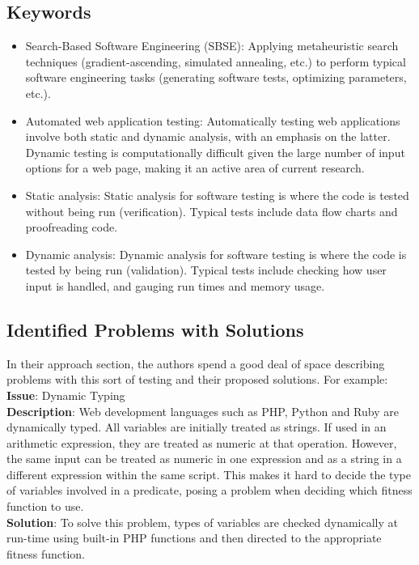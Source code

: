 \documentclass{sig-alternate-05-2015}
\begin{document}
\subsection{Keywords}
\begin{itemize}
\item Search-Based Software Engineering (SBSE): Applying metaheuristic search techniques (gradient-ascending, simulated annealing, etc.) to perform typical software engineering tasks (generating software tests, optimizing parameters, etc.).
\item Automated web application testing: Automatically testing web applications involve both static and dynamic analysis, with an emphasis on the latter. Dynamic testing is computationally difficult given the large number of input options for a web page, making it an active area of current research.
\item Static analysis: Static analysis for software testing is where the code is tested without being run (verification). Typical tests include data flow charts and proofreading code.
\item Dynamic analysis: Dynamic analysis for software testing is where the code is tested by being run (validation). Typical tests include checking how user input is handled, and gauging run times and memory usage.
\end{itemize}

\subsection{Identified Problems with Solutions}
In their approach section, the authors spend a good deal of space describing problems with this sort of testing and their proposed solutions. For example: \\

\noindent \textbf{Issue}: Dynamic Typing\\
\textbf{Description}: Web development languages such as PHP, Python and Ruby are dynamically typed. All variables are initially treated as strings. If used in an arithmetic expression, they are treated as numeric at that operation. However, the same input can be treated as numeric in one expression and as a string in a different expression within the same script. This makes it hard to decide the type of variables involved in a predicate, posing a problem when deciding which fitness function to use.\\
\textbf{Solution}: To solve this problem, types of variables are checked dynamically at run-time using built-in PHP functions and then directed to the appropriate fitness function. \\
\end{document}
